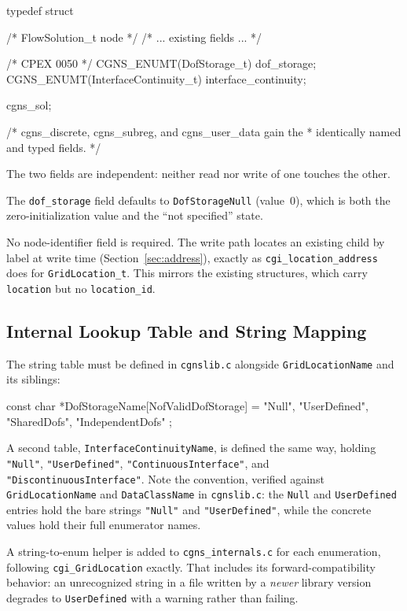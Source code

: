 \documentclass[11pt,letterpaper]{article}
\makeatletter
\let\cgns@orig@lstlisting\lstlisting
\let\cgns@endorig@lstlisting\endlstlisting
\renewenvironment{lstlisting}
  {\par\needspace{5\baselineskip}\nolinenumbers\cgns@orig@lstlisting}
  {\cgns@endorig@lstlisting\par\linenumbers}
\makeatother
\begin{document}
\begin{lstlisting}[language=C]
typedef struct {            /* FlowSolution_t node */
    /* ... existing fields ... */

    /* CPEX 0050 */
    CGNS_ENUMT(DofStorage_t)          dof_storage;
    CGNS_ENUMT(InterfaceContinuity_t) interface_continuity;
} cgns_sol;

/* cgns_discrete, cgns_subreg, and cgns_user_data gain the
 * identically named and typed fields. */
\end{lstlisting}

The two fields are independent: neither read nor write of one touches
the other.

The \texttt{dof\_storage} field defaults to
\texttt{DofStorageNull} (value~0), which is both the
zero-initialization value and the ``not specified'' state.

No node-identifier field is required.  The write path locates an
existing child by label at write time (Section~\ref{sec:address}),
exactly as \texttt{cgi\_location\_address} does for
\texttt{GridLocation\_t}.  This mirrors the existing structures, which
carry \texttt{location} but no \texttt{location\_id}.

\subsection{Internal Lookup Table and String Mapping}

The string table must be defined in \texttt{cgnslib.c} alongside
\texttt{GridLocationName} and its siblings:

\begin{lstlisting}[language=C]
const char *DofStorageName[NofValidDofStorage] = {
    "Null",
    "UserDefined",
    "SharedDofs",
    "IndependentDofs"
};
\end{lstlisting}

A second table, \texttt{InterfaceContinuityName}, is defined the same
way, holding \texttt{"Null"}, \texttt{"UserDefined"},
\texttt{"ContinuousInterface"}, and \texttt{"DiscontinuousInterface"}.
Note the convention, verified against
\texttt{GridLocationName} and \texttt{DataClassName} in
\texttt{cgnslib.c}: the \texttt{Null} and \texttt{UserDefined} entries
hold the bare strings \texttt{"Null"} and \texttt{"UserDefined"}, while
the concrete values hold their full enumerator names.

A string-to-enum helper is added to \texttt{cgns\_internals.c} for each
enumeration, following \texttt{cgi\_GridLocation} exactly.  That includes its
forward-compatibility behavior: an unrecognized string in a file
written by a \emph{newer} library version degrades to
\texttt{UserDefined} with a warning rather than failing.
\end{document}
